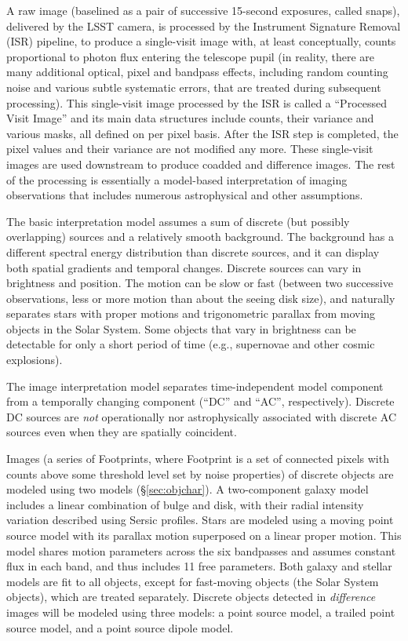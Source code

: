 \documentclass[SE,lsstdraft,toc]{lsstdoc}
\begin{document}
 A raw image (baselined as a pair of successive 15-second exposures, called snaps),
delivered by the LSST camera, is processed by the Instrument Signature
Removal (ISR) pipeline, to produce a single-visit image with, at least
conceptually, counts proportional to photon flux entering the
telescope pupil (in reality, there are many additional optical, pixel and
bandpass effects, including random counting noise and various subtle
systematic errors, that are treated during subsequent processing).
This single-visit image processed by the ISR is called a ``Processed Visit Image'' and its main data structures include counts, their variance and
various masks, all defined on per pixel basis. After the ISR step is
completed, the pixel values and their variance are not modified any more.
These single-visit images are used downstream to produce coadded and difference
images. The rest of the processing is essentially a model-based interpretation
of imaging observations that includes numerous astrophysical and other
assumptions.

The basic interpretation model assumes a sum of discrete (but possibly overlapping)
sources and a relatively smooth background. The background has a different
spectral energy distribution than discrete sources, and it can display both
spatial gradients and temporal changes. Discrete sources can vary
in brightness and position. The motion can be slow or fast (between two successive observations,
less or more motion than about the seeing disk size), and naturally separates stars
with proper motions and trigonometric parallax from moving objects in the Solar System.
Some objects that vary in brightness can be detectable for only a short period of time
(e.g., supernovae and other cosmic explosions).

The image interpretation model separates time-independent model
component from a temporally changing component (``DC'' and ``AC'',
respectively). Discrete DC sources are \textit{not} operationally nor astrophysically
associated with discrete AC sources even when they are spatially coincident.

Images (a series of Footprints, where Footprint is a set of connected pixels with
counts above some threshold level set by noise properties) of discrete objects are
modeled using two models (\S\ref{sec:objchar}). A two-component galaxy model includes a linear
combination of bulge and disk, with their radial intensity variation described using
Sersic profiles.
Stars are modeled using a moving point source model with its parallax motion
superposed on a linear proper motion. This model shares motion parameters across
the six bandpasses and assumes constant flux in each band, and thus includes
11 free parameters. Both galaxy and stellar models are fit to all objects, except
for fast-moving objects (the Solar System objects), which are treated separately.
Discrete objects detected in \emph{difference} images will be modeled using three models:
a point source model, a trailed point source model, and a point source dipole model.
\end{document}

